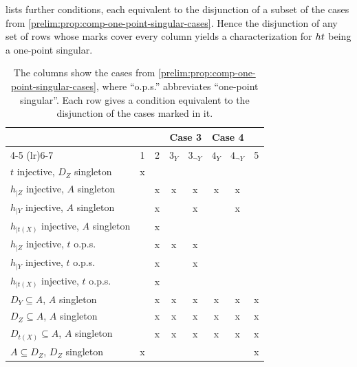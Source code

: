  lists further
conditions, each equivalent to the disjunction of a subset of the cases from
\cref{prelim:prop:comp-one-point-singular-cases}.
Hence the disjunction of any set of rows whose marks cover every column
yields a characterization for $\concat{t}{h}$ being a one-point singular.

\begin{table}[htb]
	\centering
	\caption[Conditions covering cases for composition being one-point singular]
	{The columns show the cases from
		\cref{prelim:prop:comp-one-point-singular-cases}, where ``o.p.s.''
		abbreviates ``one-point singular''.
		Each row gives a condition equivalent to the disjunction of the cases
		marked in it.}
	\label{prelim:trans:tab-one-point-singular-combining-cases}
	{\setlength{\tabcolsep}{7pt}
		\begin{tabular}{@{}lccccccc@{}}
			\toprule
			&   &   & \multicolumn{2}{c}{Case 3} & \multicolumn{2}{c}{Case 4} &   \\
			\cmidrule(lr){4-5} \cmidrule(lr){6-7}
			& 1 & 2 & $3_Y$ & $3_{\lnot Y}$ & $4_Y$ & $4_{\lnot Y}$ & 5 \\
			\midrule
			$t$ injective, $D_Z$ singleton                        & x &   &   &   &   &   &   \\
			\midrule
			$h_{|Z}$ injective, $A$ singleton                     &   & x & x & x & x & x &   \\
			$h_{|Y}$ injective, $A$ singleton                     &   & x &   & x &   & x &   \\
			$h_{|t(X)}$ injective, $A$ singleton                  &   & x &   &   &   &   &   \\
			$h_{|Z}$ injective, $t$ o.p.s.                        &   & x & x & x &   &   &   \\
			$h_{|Y}$ injective, $t$ o.p.s.                        &   & x &   & x &   &   &   \\
			$h_{|t(X)}$ injective, $t$ o.p.s.                     &   & x &   &   &   &   &   \\
			\midrule
			$D_Y \subseteq A$, $A$ singleton                      &   & x & x & x & x & x & x \\
			$D_Z \subseteq A$, $A$ singleton                      &   & x & x & x & x & x & x \\
			$D_{t(X)} \subseteq A$, $A$ singleton                 &   & x & x & x & x & x & x \\
			\midrule
			$A \subseteq D_Z$, $D_Z$ singleton                    & x &   &   &   &   &   & x \\

\end{tabular}}
\end{table}
